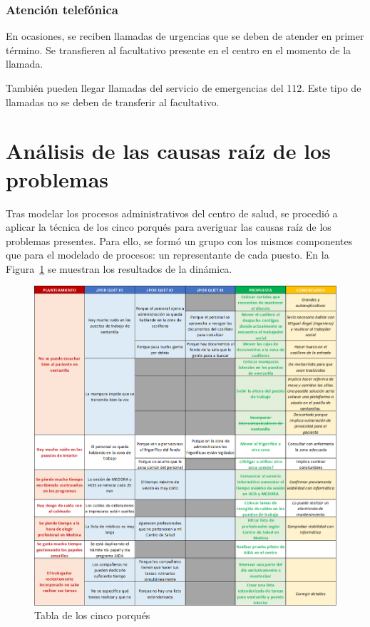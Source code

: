 \subsubsection{Atención telefónica}

En ocasiones, se reciben llamadas de urgencias que se deben de atender en primer término. Se transfieren al facultativo presente en el centro en el momento de la llamada.

También pueden llegar llamadas del servicio de emergencias del 112. Este tipo de llamadas no se deben de transferir al facultativo.

\section{Análisis de las causas raíz de los problemas}

Tras modelar los procesos administrativos del centro de salud, se procedió a aplicar la técnica de los cinco porqués para averiguar las causas raíz de los problemas presentes.
Para ello, se formó un grupo con los mismos componentes que para el modelado de procesos: un representante de cada puesto. En la Figura~\ref{fig:cinco-porques} se muestran los resultados de la dinámica.

\begin{figure}
    \includegraphics[width=\textwidth]{img/cinco-porques.png}
    \caption{Tabla de los cinco porqués}
    \label{fig:cinco-porques}
\end{figure}

